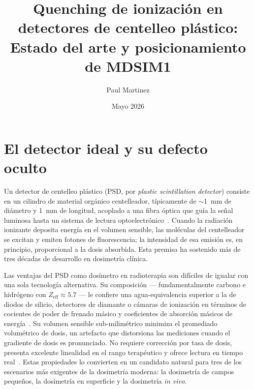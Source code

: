 \documentclass[11pt,a4paper]{article}
\title{Quenching de ionización en detectores de centelleo plástico:\\
Estado del arte y posicionamiento de MDSIM1}
\author{Paul Martinez}
\date{Mayo 2026}
\begin{document}
\maketitle
\tableofcontents
\newpage

\section{El detector ideal y su defecto oculto}




Un detector de centelleo plástico (PSD, por \textit{plastic scintillation detector}) consiste en un cilindro de material orgánico centelleador, típicamente de $\sim$1~mm de diámetro y 1~mm de longitud, acoplado a una fibra óptica que guía la señal luminosa hasta un sistema de lectura optoelectrónico~\cite{beddar1992}. Cuando la radiación ionizante deposita energía en el volumen sensible, las moléculas del centelleador se excitan y emiten fotones de fluorescencia; la intensidad de esa emisión es, en principio, proporcional a la dosis absorbida. Esta premisa ha sostenido más de tres décadas de desarrollo en dosimetría clínica.

Las ventajas del PSD como dosímetro en radioterapia son difíciles de igualar con una sola tecnología alternativa. Su composición --- fundamentalmente carbono e hidrógeno con $Z_{\mathrm{eff}} \approx 5{.}7$ --- le confiere una agua-equivalencia superior a la de diodos de silicio, detectores de diamante o cámaras de ionización en términos de cocientes de poder de frenado másico y coeficientes de absorción másicos de energía~\cite{beddar1992}. Su volumen sensible sub-milimétrico minimiza el promediado volumétrico de dosis, un artefacto que distorsiona las mediciones cuando el gradiente de dosis es pronunciado. No requiere corrección por tasa de dosis, presenta excelente linealidad en el rango terapéutico y ofrece lectura en tiempo real~\cite{bauer2026}. Estas propiedades lo convierten en un candidato natural para tres de los escenarios más exigentes de la dosimetría moderna: la dosimetría de campos pequeños, la dosimetría en superficie y la dosimetría \textit{in vivo}.
\end{document}

